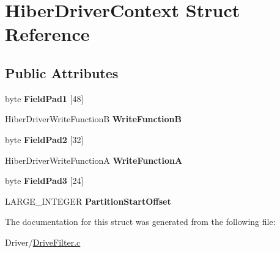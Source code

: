 \hypertarget{struct_hiber_driver_context}{}\section{Hiber\+Driver\+Context Struct Reference}
\label{struct_hiber_driver_context}
\subsection*{Public Attributes}
\begin{DoxyCompactItemize}
\item 
\mbox{\label{struct_hiber_driver_context_a2fc10927947c34fd057e7779c137a1e9}} 
byte {\bfseries Field\+Pad1} \mbox{[}48\mbox{]}
\item 
\mbox{\label{struct_hiber_driver_context_ae98ae6d8e2258a109f1d881947428bba}} 
Hiber\+Driver\+Write\+FunctionB {\bfseries Write\+FunctionB}
\item 
\mbox{\label{struct_hiber_driver_context_ac08531eceaaff462e7b97811781aecb5}} 
byte {\bfseries Field\+Pad2} \mbox{[}32\mbox{]}
\item 
\mbox{\label{struct_hiber_driver_context_ac13377b6595272924b4033342ceca0f7}} 
Hiber\+Driver\+Write\+FunctionA {\bfseries Write\+FunctionA}
\item 
\mbox{\label{struct_hiber_driver_context_a2985bb9e0f66362f3ee77394ac218cac}} 
byte {\bfseries Field\+Pad3} \mbox{[}24\mbox{]}
\item 
\mbox{\label{struct_hiber_driver_context_a5ac9d45cf10882a9148ba9030ed6a3b1}} 
L\+A\+R\+G\+E\+\_\+\+I\+N\+T\+E\+G\+ER {\bfseries Partition\+Start\+Offset}
\end{DoxyCompactItemize}


The documentation for this struct was generated from the following file\+:\begin{DoxyCompactItemize}
\item 
Driver/\hyperlink{_drive_filter_8c}{Drive\+Filter.\+c}\end{DoxyCompactItemize}
